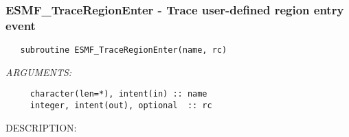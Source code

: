 
\setlength{\oldparskip}{\parskip}
\setlength{\parskip}{1.5ex}
\setlength{\oldparindent}{\parindent}
\setlength{\parindent}{0pt}
\setlength{\oldbaselineskip}{\baselineskip}
\setlength{\baselineskip}{11pt}
 
\def\bv{\begin{verbatim}}
\def\ev{\end{verbatim}}
\def\be{\begin{equation}}
\def\ee{\end{equation}}
\def\bea{\begin{eqnarray}}
\def\eea{\end{eqnarray}}
\def\bi{\begin{itemize}}
\def\ei{\end{itemize}}
\def\bn{\begin{enumerate}}
\def\en{\end{enumerate}}
\def\bd{\begin{description}}
\def\ed{\end{description}}
\def\({\left (}
\def\){\right )}
\def\[{\left [}
\def\]{\right ]}
\def\<{\left  \langle}
\def\>{\right \rangle}
\def\cI{{\cal I}}
\def\diag{\mathop{\rm diag}}
\def\tr{\mathop{\rm tr}}


 
\subsubsection [ESMF\_TraceRegionEnter] {ESMF\_TraceRegionEnter - Trace user-defined region entry event}


   
\begin{verbatim}   subroutine ESMF_TraceRegionEnter(name, rc)\end{verbatim}{\em ARGUMENTS:}
\begin{verbatim}     character(len=*), intent(in) :: name
     integer, intent(out), optional  :: rc\end{verbatim}
{\sf DESCRIPTION:\\ }


